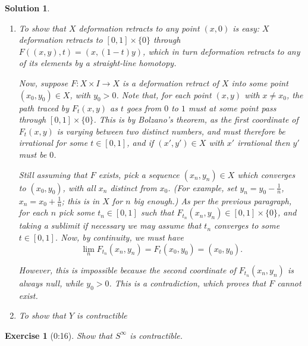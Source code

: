 \documentclass{article}
\theoremstyle{plain}
\newtheorem*{ex}{Exercise}
\theoremstyle{nonumberplain}
\newtheorem{sol}{Solution}
\begin{document}
\begin{sol}
\leavevmode
\begin{enumerate}
\item To show that $X$ deformation retracts to any point $(x,0)$ is easy: $X$ deformation retracts to $[0,1] \times \{0\}$ through $F((x,y),t) = (x,(1-t)y)$, which in turn deformation retracts to any of its elements by a straight-line homotopy.

Now, suppose $F \colon X \times I \to X$ is a deformation retract of $X$ into some point $(x_0,y_0) \in X$, with $y_0 > 0$. Note that, for each point $(x,y)$ with $x \neq x_0$, the path traced by $F_t(x,y)$ as $t$ goes from $0$ to $1$ must at some point pass through $[0,1] \times \{0\}$. This is by Bolzano's theorem, as the first coordinate of $F_t(x,y)$ is varying between two distinct numbers, and must therefore be irrational for some $t \in [0,1]$, and if $(x',y') \in X$ with $x'$ irrational then $y'$ must be $0$.

Still assuming that $F$ exists, pick a sequence $(x_n, y_n) \in X$ which converges to $(x_0, y_0)$, with all $x_n$ distinct from $x_0$. (For example, set $y_n = y_0 - \frac1n$, $x_n = x_0 + \frac1n$; this is in $X$ for $n$ big enough.) As per the previous paragraph, for each $n$ pick some $t_n \in [0,1]$ such that $F_{t_n}(x_n,y_n) \in [0,1] \times \{0\}$, and taking a sublimit if necessary we may assume that $t_n$ converges to some $t \in [0,1]$. Now, by continuity, we must have
\begin{equation}
\lim_n F_{t_n}(x_n,y_n) = F_t(x_0,y_0) = (x_0,y_0).
\end{equation}

However, this is impossible because the second coordinate of $F_{t_n}(x_n,y_n)$ is always null, while $y_0 > 0$. This is a contradiction, which proves that $F$ cannot exist.

\item To show that $Y$ is contractible
\end{enumerate}
\end{sol}

\begin{ex}[0:16]
Show that $S^\infty$ is contractible.
\end{ex}
\end{document}
